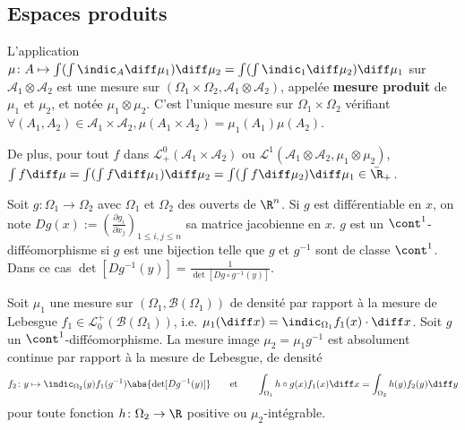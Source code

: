 \subsection{Espaces produits}

	\begin{thm}
		L'application $\mu \colon A \mapsto \int (\int \indic_A \diff \mu_1) \diff \mu_2 = \int (\int \indic_1 \diff \mu_2) \diff \mu_1$ sur $\mathcal{A}_1 \otimes \mathcal{A}_2$ est une mesure sur $(\Omega_1 \times \Omega_2, \mathcal{A}_1 \otimes \mathcal{A}_2)$, appelée \textbf{mesure produit} de $\mu_1$ et $\mu_2$, et notée $\mu_1 \otimes \mu_2$.
		C'est l'unique mesure sur $\Omega_1 \times \Omega_2$ vérifiant $\forall (A_1, A_2) \in \mathcal{A}_1 \times \mathcal{A}_2, \mu(A_1 \times A_2) = \mu_1(A_1) \mu(A_2)$.
		
		De plus, pour tout $f$ dans $\mathcal{L}^0_+(\mathcal{A}_1 \times \mathcal{A}_2)$ ou $\mathcal{L}^1(\mathcal{A}_1 \otimes \mathcal{A}_2, \mu_1 \otimes \mu_2)$, $\int f \diff \mu = \int (\int f \diff \mu_1) \diff \mu_2 = \int(\int f \diff \mu_2) \diff \mu_1 \in \Bar{\R}_+$.
	\end{thm}

	Soit $g \colon \Omega_1 \to \Omega_2$ avec $\Omega_1$ et $\Omega_2$ des ouverts de $\R^n$.
	Si $g$ est différentiable en $x$, on note $Dg(x) := \left( \frac{\partial g_i}{\partial x_j} \right)_{1 \leq i,j \leq n}$ sa matrice jacobienne en $x$.
	$g$ est un $\cont^1$-difféomorphisme si $g$ est une bijection telle que $g$ et $g^{-1}$ sont de classe $\cont^1$.
	Dans ce cas $\det[Dg^{-1}(y)] = \frac{1}{\det[Dg \circ g^{-1}(y)]}$.

	\begin{thm}
		Soit $\mu_1$ une mesure sur $(\Omega_1, \mathcal{B}(\Omega_1))$ de densité par rapport à la mesure de Lebesgue $f_1 \in \mathcal{L}_0^+(\mathcal{B}(\Omega_1))$, i.e. $\mu_1(\diff x) = \indic_{\Omega_1} f_1(x) \cdot \diff  x$.
		Soit $g$ un $\cont^1$-difféomorphisme.
		La mesure image $\mu_2 = \mu_1 g^{-1}$ est absolument continue par rapport à la mesure de Lebesgue, de densité
		$$f_2 \colon y \mapsto \indic_{\Omega_2}(y) f_1 (g^{-1}) \abs{\det[D g^{-1}(y)]}
		\qquad \text{et} \qquad
		\int_{\Omega_1} h \circ g(x) f_1(x) \diff x = \int_{\Omega_2} h(y) f_2(y) \diff y$$
		pour toute fonction $h \colon \Omega_2 \to \R$ positive ou $\mu_2$-intégrable.
	\end{thm}
